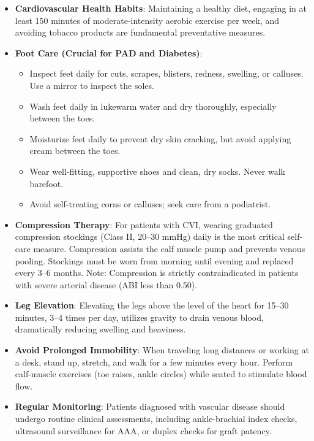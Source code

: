 \begin{itemize}
    \item \textbf{Cardiovascular Health Habits}: Maintaining a healthy diet, engaging in at least 150 minutes of moderate-intensity aerobic exercise per week, and avoiding tobacco products are fundamental preventative measures.
    \item \textbf{Foot Care (Crucial for PAD and Diabetes)}:
    \begin{itemize}
        \item Inspect feet daily for cuts, scrapes, blisters, redness, swelling, or calluses. Use a mirror to inspect the soles.
        \item Wash feet daily in lukewarm water and dry thoroughly, especially between the toes.
        \item Moisturize feet daily to prevent dry skin cracking, but avoid applying cream between the toes.
        \item Wear well-fitting, supportive shoes and clean, dry socks. Never walk barefoot.
        \item Avoid self-treating corns or calluses; seek care from a podiatrist.
    \end{itemize}
    \item \textbf{Compression Therapy}: For patients with CVI, wearing graduated compression stockings (Class II, 20--30 mmHg) daily is the most critical self-care measure. Compression assists the calf muscle pump and prevents venous pooling. Stockings must be worn from morning until evening and replaced every 3--6 months. Note: Compression is strictly contraindicated in patients with severe arterial disease (ABI less than 0.50).
    \item \textbf{Leg Elevation}: Elevating the legs above the level of the heart for 15--30 minutes, 3--4 times per day, utilizes gravity to drain venous blood, dramatically reducing swelling and heaviness.
    \item \textbf{Avoid Prolonged Immobility}: When traveling long distances or working at a desk, stand up, stretch, and walk for a few minutes every hour. Perform calf-muscle exercises (toe raises, ankle circles) while seated to stimulate blood flow.
    \item \textbf{Regular Monitoring}: Patients diagnosed with vascular disease should undergo routine clinical assessments, including ankle-brachial index checks, ultrasound surveillance for AAA, or duplex checks for graft patency.
\end{itemize}

